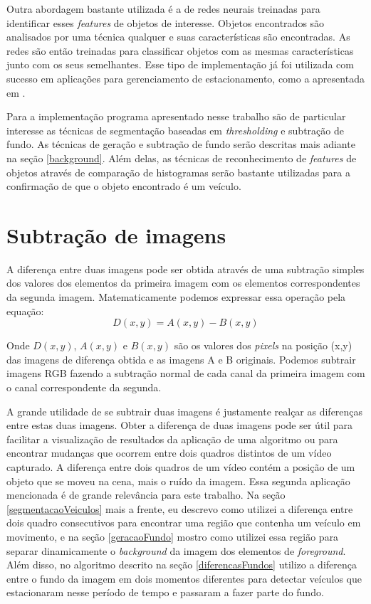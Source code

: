     Outra abordagem bastante utilizada é a de redes neurais treinadas para identificar esses \textit{features} de objetos de interesse. Objetos encontrados são analisados por uma técnica qualquer e suas características são encontradas. As redes são então treinadas para classificar objetos com as mesmas características junto com os seus semelhantes. Esse tipo de implementação já foi utilizada com sucesso em aplicações para gerenciamento de estacionamento, como a apresentada em \cite{true2007vacant}.

    Para a implementação programa apresentado nesse trabalho são de particular interesse as técnicas de segmentação baseadas em \textit{thresholding} e subtração de fundo. As técnicas de geração e subtração de fundo serão descritas mais adiante na seção \ref{background}. Além delas, as técnicas de reconhecimento de \textit{features} de objetos através de comparação de histogramas serão bastante utilizadas para a confirmação de que o objeto encontrado é um veículo.

    \section{Subtração de imagens}  \label{subtracao}

    A diferença entre duas imagens pode ser obtida através de uma subtração simples dos valores dos elementos da primeira imagem com os elementos correspondentes da segunda imagem. Matematicamente podemos expressar essa operação pela equação:
    \begin{equation}
        D(x,y) = A(x,y) - B(x,y)
    \end{equation}

    Onde $D(x,y)$, $A(x,y)$ e $B(x,y)$ são os valores dos \textit{pixels} na posição (x,y) das imagens de diferença obtida e as imagens A e B originais. Podemos subtrair imagens RGB fazendo a subtração normal de cada canal da primeira imagem com o canal correspondente da segunda.

    A grande utilidade de se subtrair duas imagens é justamente realçar as diferenças entre estas duas imagens. Obter a diferença de duas imagens pode ser útil para facilitar a visualização de resultados da aplicação de uma algoritmo ou para encontrar mudanças que ocorrem entre dois quadros distintos de um vídeo capturado. A diferença entre dois quadros de um vídeo contém a posição de um objeto que se moveu na cena, mais o ruído da imagem. Essa segunda aplicação mencionada é de grande relevância para este trabalho. Na seção \ref{segmentacaoVeiculos} mais a frente, eu descrevo como utilizei a diferença entre dois quadro consecutivos para encontrar uma região que contenha um veículo em movimento, e na seção \ref{geracaoFundo} mostro como utilizei essa região para separar dinamicamente o \textit{background} da imagem dos elementos de \textit{foreground}. Além disso, no algoritmo descrito na seção \ref{diferencasFundos} utilizo a diferença entre o fundo da imagem em dois momentos diferentes para detectar veículos que estacionaram nesse período de tempo e passaram a fazer parte do fundo.

